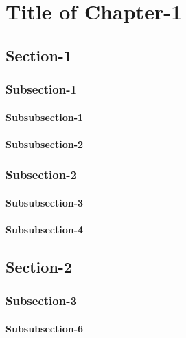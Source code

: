 \documentclass{memoir}
\begin{document}
	
	\chapter{Title of Chapter-1}
	
		\section{Section-1}
			
			\subsection{Subsection-1}

				\subsubsection{Subsubsection-1}
	
				\subsubsection{Subsubsection-2}
				
			\subsection{Subsection-2}
			
				\subsubsection{Subsubsection-3}
			
				\subsubsection{Subsubsection-4}
		
		
		
		\section{Section-2}
		
			\subsection{Subsection-3}	

				\subsubsection{Subsubsection-6}
		
\end{document}
